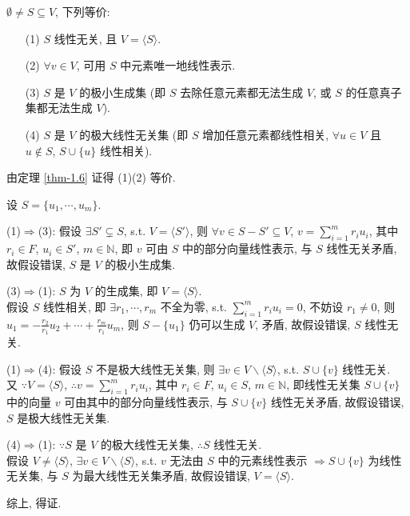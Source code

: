 \documentclass{note}
\begin{document}
\begin{thm}[(课本定理 1.7)]
    $\emptyset\neq S\subseteq V$, 下列等价:
    \begin{itemize}
        \item[(1)] $S$ 线性无关, 且 $V=\langle S\rangle$.
        \item[(2)] $\forall v\in V$, 可用 $S$ 中元素唯一地线性表示.
        \item[(3)] $S$ 是 $V$ 的极小生成集 (即 $S$ 去除任意元素都无法生成 $V$, 或 $S$ 的任意真子集都无法生成 $V$).
        \item[(4)] $S$ 是 $V$ 的极大线性无关集 (即 $S$ 增加任意元素都线性相关, $\forall u\in V$ 且 $u\notin S$, $S\cup\{u\}$ 线性相关).
    \end{itemize}
\end{thm}
\begin{pf}
    由定理 \ref{thm-1.6} 证得 (1)(2) 等价.

    设 $S=\{u_1,\cdots,u_m\}$.

    (1)$\Longrightarrow$(3): 假设 $\exists S'\subsetneq S$, s.t. $V=\langle S'\rangle$, 则 $\forall v\in S-S'\subseteq V$, $v=\sum_{i=1}^mr_iu_i$, 其中 $r_i\in F$, $u_i\in S'$, $m\in\mathbb{N}$, 即 $v$ 可由 $S$ 中的部分向量线性表示, 与 $S$ 线性无关矛盾, 故假设错误, $S$ 是 $V$ 的极小生成集.

    (3)$\Longrightarrow$(1): $S$ 为 $V$ 的生成集, 即 $V=\langle S\rangle$.\\
    假设 $S$ 线性相关, 即 $\exists r_1,\cdots,r_m$ 不全为零, s.t. $\sum_{i=1}^mr_iu_i=0$, 不妨设 $r_1\neq 0$, 则 $u_1=-\frac{r_2}{r_1}u_2+\cdots+\frac{r_m}{r_1}u_m$, 则 $S-\{u_1\}$ 仍可以生成 $V$, 矛盾, 故假设错误, $S$ 线性无关.

    (1)$\Longrightarrow$(4): 假设 $S$ 不是极大线性无关集, 则 $\exists v\in V\backslash\langle S\rangle$, s.t. $S\cup\{v\}$ 线性无关.\\
    又 $\because V=\langle S\rangle$, $\therefore v=\sum_{i=1}^mr_iu_i$, 其中 $r_i\in F$, $u_i\in S$, $m\in\mathbb{N}$, 即线性无关集 $S\cup\{v\}$ 中的向量 $v$ 可由其中的部分向量线性表示, 与 $S\cup\{v\}$ 线性无关矛盾, 故假设错误, $S$ 是极大线性无关集.

    (4)$\Longrightarrow$(1): $\because S$ 是 $V$ 的极大线性无关集, $\therefore S$ 线性无关.\\
    假设 $V\neq\langle S\rangle$, $\exists v\in V\backslash\langle S\rangle$, s.t. $v$ 无法由 $S$ 中的元素线性表示 $\Longrightarrow S\cup\{v\}$ 为线性无关集, 与 $S$ 为最大线性无关集矛盾, 故假设错误, $V=\langle S\rangle$.

    综上, 得证.
\end{pf}
\end{document}
